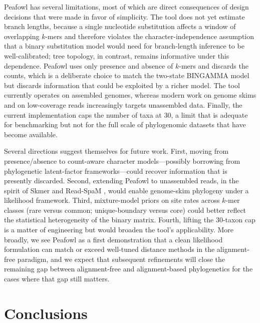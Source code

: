 \documentclass[11pt]{article}
\begin{document}
Peafowl has several limitations, most of which are direct consequences of
design decisions that were made in favor of simplicity. The tool does not
yet estimate branch lengths, because a single nucleotide substitution
affects a window of overlapping $k$-mers and therefore violates the
character-independence assumption that a binary substitution model would
need for branch-length inference to be well-calibrated; tree topology, in
contrast, remains informative under this dependence. Peafowl uses only
presence and absence of $k$-mers and discards the counts, which is a
deliberate choice to match the two-state BINGAMMA model but discards
information that could be exploited by a richer model. The tool currently
operates on assembled genomes, whereas modern work on genome skims
\citep{sarmashghi2019skmer} and on low-coverage reads
\citep{lau2019readspam, yi2013cophylog} increasingly targets unassembled
data. Finally, the current implementation caps the number of taxa at 30,
a limit that is adequate for benchmarking but not for the full scale of
phylogenomic datasets that have become available.

Several directions suggest themselves for future work. First, moving from
presence/absence to count-aware character models---possibly borrowing from
phylogenetic latent-factor frameworks---could recover information that is
presently discarded. Second, extending Peafowl to unassembled reads, in
the spirit of Skmer \citep{sarmashghi2019skmer} and Read-SpaM
\citep{lau2019readspam}, would enable genome-skim phylogeny under a
likelihood framework. Third, mixture-model priors on site rates across
$k$-mer classes (rare versus common; unique-boundary versus core) could
better reflect the statistical heterogeneity of the binary matrix.
Fourth, lifting the 30-taxon cap is a matter of engineering but would
broaden the tool's applicability. More broadly, we see Peafowl as a first
demonstration that a clean likelihood formulation can match or exceed
well-tuned distance methods in the alignment-free paradigm, and we expect
that subsequent refinements will close the remaining gap between
alignment-free and alignment-based phylogenetics for the cases where that
gap still matters.

\section{Conclusions}
\end{document}
